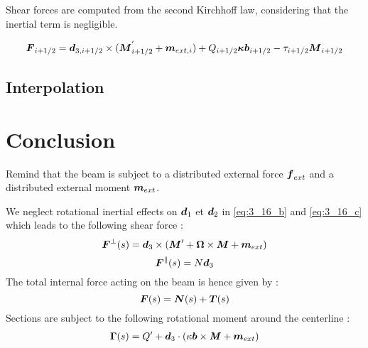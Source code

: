 Shear forces are computed from the second Kirchhoff law, considering that the inertial term is negligible.

\begin{equation}
	 \boldsymbol{F}_{i+1/2} = \boldsymbol{d}_{3, i+1/2} \times (\boldsymbol{M}_{i+1/2}^{'} + \boldsymbol{m}_{ext, i}) + Q_{i+1/2} \boldsymbol{\kappa b}_{i+1/2} - \tau_{i+1/2} \boldsymbol{M}_{i+1/2}
\end{equation}

\subsection{Interpolation}


\section{Conclusion}
Remind that the beam is subject to a distributed external force $\boldsymbol{f}_{ext}$ and a distributed external moment $\boldsymbol{m}_{ext}$.

We neglect rotational inertial effects on $\boldsymbol{d}_1$ et $\boldsymbol{d}_2$ in \eqref{eq:3_16_b} and \eqref{eq:3_16_c} which leads to the following shear force :
\begin{equation}
	\boldsymbol{F}^{\perp}(s) = \boldsymbol{d}_3 \times (\boldsymbol{M}' + \boldsymbol{\Omega} \times \boldsymbol{M} + \boldsymbol{m}_{ext})
\end{equation}
\begin{equation}
	\boldsymbol{F}^{\parallel}(s) = N \boldsymbol{d}_3
\end{equation}
 The total internal force acting on the beam is hence given by :
\begin{equation}
	\boldsymbol{F}(s) = \boldsymbol{N}(s) + \boldsymbol{T}(s)
\end{equation}
Sections are subject to the following rotational moment around the centerline :
\begin{equation}
	\begin{aligned}
	\boldsymbol{\Gamma}(s) = Q' + \boldsymbol{d}_3 \cdot ( \kappa\boldsymbol{b} \times \boldsymbol{\mathit{M}} + \boldsymbol{m}_{ext})
	\end{aligned}
\end{equation}

\clearpage



\clearpage


